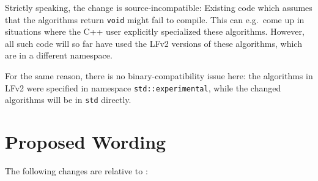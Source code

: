 \documentclass[11pt]{article}
\begin{document}
Strictly speaking, the change is source-incompatible: Existing code
which assumes that the algorithms return \texttt{void} might fail to
compile. This can e.g.\ come up in situations where the C++ user
explicitly specialized these algorithms. However, all such code will
so far have used the LFv2 versions of these algorithms, which are in a
different namespace.

For the same reason, there is no binary-compatibility issue here: the
algorithms in LFv2 were specified in namespace
\texttt{std::experimental}, while the changed algorithms will be in
\texttt{std} directly.

\section{Proposed Wording}
\label{wording}

The following changes are relative to \cite{N4835}:
\end{document}
